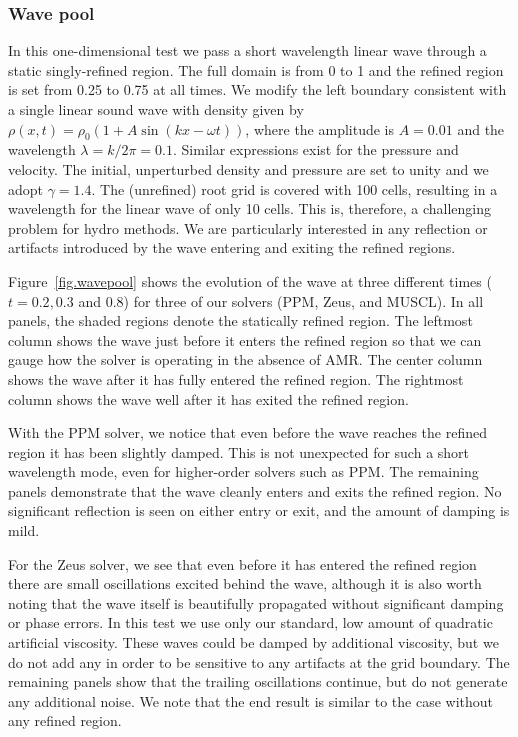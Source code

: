 \subsubsection{Wave pool}
\label{sec.tests.wavepool}

In this one-dimensional test we pass a short wavelength linear wave through a static singly-refined region.  The full domain is from 0 to 1 and the refined region is set from 0.25 to 0.75 at all times.  We modify the left boundary consistent with a single linear sound wave with density given by $\rho(x,t) = \rho_0 (1 + A \sin(kx - \omega t))$, where the amplitude is $A = 0.01$ and the wavelength $\lambda = k/2\pi = 0.1$.  Similar expressions exist for the pressure and velocity.  The initial, unperturbed density and pressure are set to unity and we adopt $\gamma = 1.4$.  The (unrefined) root grid is covered with 100 cells, resulting in a wavelength for the linear wave of only 10 cells.  This is, therefore, a challenging problem for hydro methods.  We are particularly interested in any reflection or artifacts introduced by the wave entering and exiting the refined regions.

Figure~\ref{fig.wavepool} shows the evolution of the wave at three different times ($t = 0.2, 0.3$ and 0.8) for three of our solvers (PPM, Zeus, and MUSCL).  In all panels, the shaded regions denote the statically refined region. The leftmost column shows the wave just before it enters the refined region so that we can gauge how the solver is operating in the absence of AMR.  The center column shows the wave after it has fully entered the refined region.  The rightmost column shows the wave well after it has exited the refined region.

With the PPM solver, we notice that even before the wave reaches the refined region it has been slightly damped. This is not unexpected for such a short wavelength mode, even for higher-order solvers such as PPM.  The remaining panels demonstrate that the wave cleanly enters and exits the refined region.  No significant reflection is seen on either entry or exit, and the amount of damping is mild.

For the Zeus solver, we see that even before it has entered the refined region there are small oscillations excited behind the wave, although it is also worth noting that the wave itself is beautifully propagated without significant damping or phase errors.  In this test we use only our standard, low amount of quadratic artificial viscosity.  These waves could be damped by additional viscosity, but we do not add any in order to be sensitive to any artifacts at the grid boundary.  The remaining panels show that the trailing oscillations continue, but do not generate any additional noise. We note that the end result is similar to the case without any refined region.

